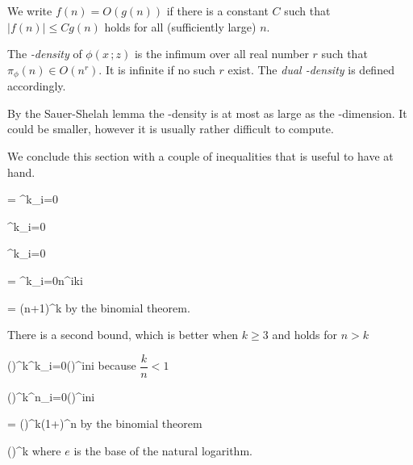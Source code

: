 \documentclass[scombinatorics.tex]{subfiles}
\begin{document}
We write $f(n)=O(g(n))$ if there is a constant $C$ such that $|f(n)|\le C g(n)$ holds for all (sufficiently large) $n$.

The \emph{\vc-density\/} of $\phi(x\,;z)$ is the infimum over all real number $r$ such that $\pi_\phi(n)\in O(n^r)$.
It is infinite if no such $r$ exist.
The  \emph{dual \vc-density\/} is defined accordingly.

By the Sauer-Shelah lemma the \vc-density is at most as large as the \vc-dimension.
It could be smaller, however it is usually rather difficult to compute.

We conclude this section with a couple of inequalities that is useful to have at hand.

{=}
{\sum^k_{i=0}}

\ceq{}
{\le}
{\sum^k_{i=0}}

\ceq{}
{\le}
{\sum^k_{i=0}}

\ceq{}
{=}
{\sum^k_{i=0}n^i{k\choose i}}

\ceq{}
{=}
{(n+1)^k}
\hfill by the binomial theorem.\smallskip

There is a second bound, which is better when $k\ge 3$ and holds for $n>k$

{\le}
{\Big(\Big)^{\!k}\sum^k_{i=0}\Big(\Big)^{\!i}{n\choose i}}
\hfill because $\dfrac{k}{n}<1$

\ceq{}
{\le}
{\Big(\Big)^{\!k}\sum^n_{i=0}\Big(\Big)^{\!i}{n\choose i}}

\ceq{}
{=}
{\Big(\Big)^{\!k}\Big(1+\Big)^n}
\hfill by the binomial theorem

\ceq{}
{\le}
{\Big(\Big)^{\!k}}
\hfill where $e$ is the base of the natural logarithm.
\end{document}
